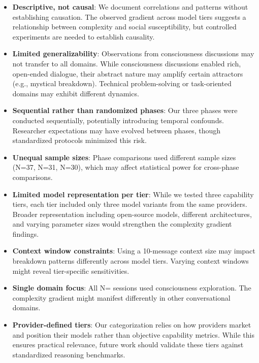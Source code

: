 \documentclass[11pt,letterpaper]{article}
\newcommand{\exponedataTotalSessionsRaw}{37}
\newcommand{\exponedataTotalSessions}{N=\exponedataTotalSessionsRaw}
\newcommand{\exptwoTotalSessionsRaw}{31}
\newcommand{\exptwoTotalSessions}{N=\exptwoTotalSessionsRaw}
\newcommand{\expthreeTotalSessionsRaw}{30}
\newcommand{\expthreeTotalSessions}{N=\expthreeTotalSessionsRaw}
\newcommand{\totalAllPhasesRaw}{\fpeval{\exponedataTotalSessionsRaw + \exptwoTotalSessionsRaw + \expthreeTotalSessionsRaw}}
\newcommand{\totalAllPhases}{N=\totalAllPhasesRaw}
\begin{document}
\begin{itemize}
    \item \textbf{Descriptive, not causal}: We document correlations and patterns without establishing causation. The observed gradient across model tiers suggests a relationship between complexity and social susceptibility, but controlled experiments are needed to establish causality.
    
    \item \textbf{Limited generalizability}: Observations from consciousness discussions may not transfer to all domains. While consciousness discussions enabled rich, open-ended dialogue, their abstract nature may amplify certain attractors (e.g., mystical breakdown). Technical problem-solving or task-oriented domains may exhibit different dynamics.
    
    \item \textbf{Sequential rather than randomized phases}: Our three phases were conducted sequentially, potentially introducing temporal confounds. Researcher expectations may have evolved between phases, though standardized protocols minimized this risk.
    
    \item \textbf{Unequal sample sizes}: Phase comparisons used different sample sizes (\exponedataTotalSessions{}, \exptwoTotalSessions{}, \expthreeTotalSessions{}), which may affect statistical power for cross-phase comparisons.
    
    \item \textbf{Limited model representation per tier}: While we tested three capability tiers, each tier included only three model variants from the same providers. Broader representation including open-source models, different architectures, and varying parameter sizes would strengthen the complexity gradient findings.
    
    \item \textbf{Context window constraints}: Using a 10-message context size may impact breakdown patterns differently across model tiers. Varying context windows might reveal tier-specific sensitivities.
    
    \item \textbf{Single domain focus}: All \totalAllPhases{} sessions used consciousness exploration. The complexity gradient might manifest differently in other conversational domains.
    
    \item \textbf{Provider-defined tiers}: Our categorization relies on how providers market and position their models rather than objective capability metrics. While this ensures practical relevance, future work should validate these tiers against standardized reasoning benchmarks.
\end{itemize}
\end{document}
